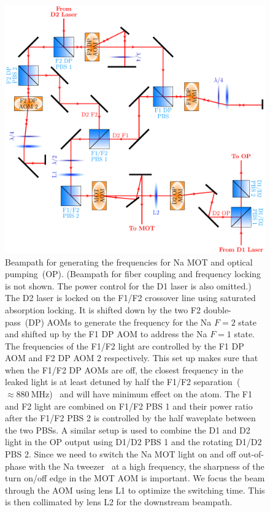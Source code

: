 \begin{figure}
  \centering
  \includegraphics[width=\textwidth]{figures/loading_na_res_beampath.pdf}
  \caption[Beampath for Na D1 and D2 light.]{
    Beampath for generating the frequencies for Na MOT and optical pumping~(OP).
    (Beampath for fiber coupling and frequency locking is not shown.
    The power control for the D1 laser is also omitted.)
    The D2 laser is locked on the F1/F2 crossover line using
    saturated absorption locking.
    It is shifted down by the two F2 double-pass~(DP) AOMs to generate the frequency
    for the Na $F=2$ state and shifted up by the F1 DP AOM to address the Na $F=1$ state.
    The frequencies of the F1/F2 light are controlled by the F1 DP AOM
    and F2 DP AOM 2 respectively.
    This set up makes sure that when the F1/F2 DP AOMs are off,
    the closest frequency in the leaked light is at least detuned
    by half the F1/F2 separation~($\approx880~\mathrm{MHz}$)~\cite{steck_sodium_2019}
    and will have minimum effect on the atom.
    The F1 and F2 light are combined on F1/F2 PBS 1 and their power ratio after the
    F1/F2 PBS 2 is controlled by the half waveplate between the two PBSs.
    A similar setup is used to combine the D1 and D2 light in the OP output using
    D1/D2 PBS 1 and the rotating D1/D2 PBS 2.
    Since we need to switch the Na MOT light on and off out-of-phase
    with the Na tweezer~\cite{hutzler_eliminating_2017} at a high frequency,
    the sharpness of the turn on/off edge in the MOT AOM is important.
    We focus the beam through the AOM using lens L1 to optimize the switching time.
    This is then collimated by lens L2 for the downstream beampath.
    \label{fig:loading:free-space:na-res-beampath}}
\end{figure}

